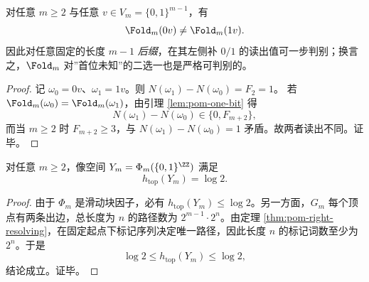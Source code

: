 \begin{theorem}[一步可判别与左解析性]\label{thm:pom-left-resolving}
对任意 $m\ge 2$ 与任意 $v\in V_m=\{0,1\}^{m-1}$，有
\[
\Fold_m(0v)\neq \Fold_m(1v).
\]
因此对任意固定的长度 $m-1$ \emph{后缀}，在其左侧补 $0/1$ 的读出值可一步判别；换言之，$\Fold_m$ 对”首位未知”的二选一也是严格可判别的。
\end{theorem}
\begin{proof}
记 $\omega_0=0v$、$\omega_1=1v$。则 $N(\omega_1)-N(\omega_0)=F_2=1$。
若 $\Fold_m(\omega_0)=\Fold_m(\omega_1)$，由引理 \ref{lem:pom-one-bit} 得
\[
N(\omega_1)-N(\omega_0)\in\{0,F_{m+2}\},
\]
而当 $m\ge 2$ 时 $F_{m+2}\ge 3$，与 $N(\omega_1)-N(\omega_0)=1$ 矛盾。故两者读出不同。证毕。
\end{proof}

\begin{theorem}\label{thm:pom-entropy-saturation}
对任意 $m\ge 2$，像空间 $Y_m=\Phi_m(\{0,1\}^{\ZZ})$ 满足
\[
h_{\mathrm{top}}(Y_m)=\log 2.
\]
\end{theorem}
\begin{proof}
由于 $\Phi_m$ 是滑动块因子，必有 $h_{\mathrm{top}}(Y_m)\le \log 2$。另一方面，$G_m$ 每个顶点有两条出边，总长度为 $n$ 的路径数为 $2^{m-1}\cdot 2^{n}$。由定理 \ref{thm:pom-right-resolving}，在固定起点下标记序列决定唯一路径，因此长度 $n$ 的标记词数至少为 $2^{n}$。于是
\[
\log 2\le h_{\mathrm{top}}(Y_m)\le \log 2,
\]
结论成立。证毕。
\end{proof}

